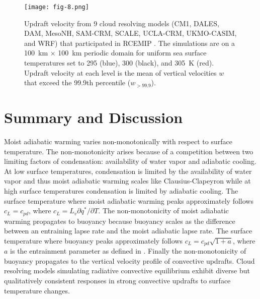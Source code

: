\documentclass[draft]{ametsocV6.1}
\begin{document}
\clearpage

\begin{figure}[htbp]
 \centering
 \texttt{[image: fig-8.png]}\\
 \caption{Updraft velocity from 9 cloud resolving models (CM1, DALES, DAM, MesoNH, SAM-CRM, SCALE, UCLA-CRM, UKMO-CASIM, and WRF) that participated in RCEMIP \citep{wing2018}. The simulations are on a 100~km $\times$ 100~km periodic domain for uniform sea surface temperatures set to 295 (blue), 300 (black), and 305~K (red). Updraft velocity at each level is the mean of vertical velocities $w$ that exceed the 99.9th percentile ($w_{>99.9}$).}\label{fig:fig-8}
\end{figure}


\section{Summary and Discussion}

Moist adiabatic warming varies non-monotonically with respect to surface temperature. The non-monotonicity arises because of a competition between two limiting factors of condensation: availability of water vapor and adiabatic cooling. At low surface temperatures, condensation is limited by the availability of water vapor and thus moist adiabatic warming scales like Clausius-Clapeyron while at high surface temperatures condensation is limited by adiabatic cooling. The surface temperature where moist adiabatic warming peaks approximately follows $c_L = c_{pd}$, where $c_L = L_v \partial q^* / \partial T$. The non-monotonicity of moist adiabatic warming propagates to buoyancy because buoyancy scales as the difference between an entraining lapse rate and the moist adiabatic lapse rate. The surface temperature where buoyancy peaks approximately follows $c_L = c_{pd} \sqrt{1+a}$, where $a$ is the entrainment parameter as defined in \cite{romps2016}. Finally the non-monotonicity of buoyancy propagates to the vertical velocity profile of convective updrafts. Cloud resolving models simulating radiative convective equilibrium exhibit diverse but qualitatively consistent responses in strong convective updrafts to surface temperature changes.
\end{document}
